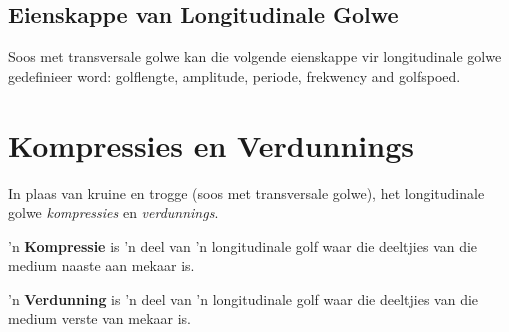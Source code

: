             \subsection*{Eienskappe van Longitudinale Golwe}
            \nopagebreak
      \label{m38782*id292291}Soos met transversale golwe kan die volgende eienskappe vir longitudinale golwe gedefinieer word:
golflengte, amplitude, periode, frekwency and golfspoed. 
      \label{m38782*uid6}
            \section{Kompressies en Verdunnings}
            \nopagebreak
In plaas van kruine en trogge (soos met transversale golwe), het longitudinale golwe \textsl{kompressies} en \textsl{verdunnings}.\par

 { \label{m38782*meaningfhsst!!!underscore!!!id105}
       'n \textbf{Kompressie} is  'n deel van  'n longitudinale golf waar die deeltjies van die medium naaste aan mekaar is.
       } 
\par
{} { \label{m38782*meaningfhsst!!!underscore!!!id108}
       'n \textbf{Verdunning} is  'n deel van  'n longitudinale golf waar die deeltjies van die medium verste van mekaar is.
       } 



